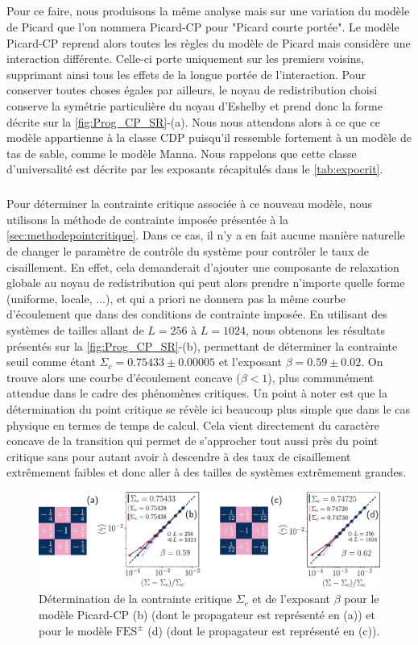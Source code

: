\subparagraph{} Pour ce faire, nous produisons la même analyse mais sur une variation du modèle de Picard que l'on nommera Picard-CP pour "Picard courte portée". Le modèle Picard-CP reprend alors toutes les règles du modèle de Picard mais considère une interaction différente. Celle-ci porte uniquement sur les premiers voisins, supprimant ainsi tous les effets de la longue portée de l'interaction. Pour conserver toutes choses égales par ailleurs, le noyau de redistribution choisi conserve la symétrie particulière du noyau d'Eshelby et prend donc la forme décrite sur la \autoref{fig:Prog_CP_SR}-(a). Nous nous attendons alors à ce que ce modèle appartienne à la classe CDP puisqu'il ressemble fortement à un modèle de tas de sable, comme le modèle Manna. Nous rappelons que cette classe d'universalité est décrite par les exposants récapitulés dans le \autoref{tab:expocrit}.

\subparagraph{}Pour déterminer la contrainte critique associée à ce nouveau modèle, nous utilisons la méthode de contrainte imposée présentée à la \autoref{sec:methodepointcritique}. Dans ce cas, il n'y a en fait aucune manière naturelle de changer le paramètre de contrôle du système pour contrôler le taux de cisaillement. En effet, cela demanderait d'ajouter une composante de relaxation globale au noyau de redistribution qui peut alors prendre n'importe quelle forme (uniforme, locale, ...), et qui a priori ne donnera pas la même courbe d'écoulement que dans des conditions de contrainte imposée. En utilisant des systèmes de tailles allant de $L=256$ à $L=1024$, nous obtenons les résultats présentés sur la \autoref{fig:Prog_CP_SR}-(b), permettant de déterminer la contrainte seuil comme étant $\Sigma_c = 0.75433 \pm 0.00005$ et l'exposant $\beta = 0.59 \pm 0.02$. On trouve alors une courbe d'écoulement concave ($\beta < 1$), plus communément attendue dans le cadre des phénomènes critiques. Un point à noter est que la détermination du point critique se révèle ici beaucoup plus simple que dans le cas physique en termes de temps de calcul. Cela vient directement du caractère concave de la transition qui permet de s'approcher tout aussi près du point critique sans pour autant avoir à descendre à des taux de cisaillement extrêmement faibles et donc aller à des tailles de systèmes extrêmement grandes.

\begin{figure}[h]
	\centering
	\includegraphics[width=\textwidth]{Chapitre4/Figures/CourtePortee/Prog_CP.pdf}
	\caption{Détermination de la contrainte critique $\Sigma_c$ et de l'exposant $\beta$ pour le modèle Picard-CP (b) (dont le propagateur est représenté en (a)) et pour le modèle $\text{FES}^\pm$ (d) (dont le propagateur est représenté en (c)).}
	\label{fig:Prog_CP_SR}
\end{figure}

